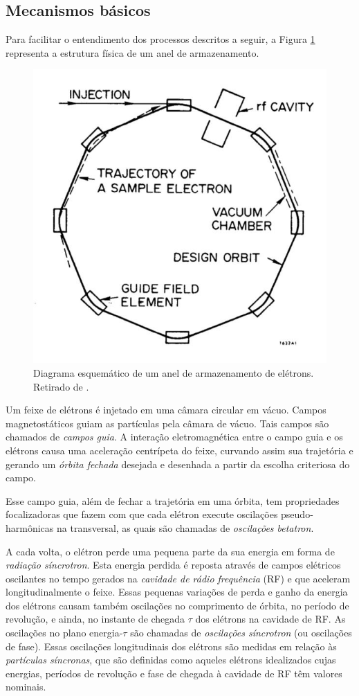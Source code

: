 \subsection{Mecanismos básicos}
Para facilitar o entendimento dos processos descritos a seguir, a Figura \ref{fig:ring} representa a estrutura física de um anel de armazenamento.
	
\begin{figure}[!htb]
	\centering
	\includegraphics[width=0.6\linewidth]{./Figuras/fig1.jpeg}
	\caption{Diagrama esquemático de um anel de armazenamento de elétrons. Retirado de 						\cite{sands1970physics}.}
	\label{fig:ring}
\end{figure}
	
Um feixe de elétrons é injetado em uma câmara circular em vácuo. Campos magnetostáticos guiam as partículas pela câmara de vácuo. Tais campos são chamados de \emph{campos guia}. A interação eletromagnética entre o campo guia e os elétrons causa uma aceleração centrípeta do feixe, curvando assim sua trajetória e gerando um \emph{órbita fechada} desejada e desenhada a partir da escolha criteriosa do campo.
	
Esse campo guia, além de fechar a trajetória em uma órbita, tem propriedades focalizadoras que fazem com que cada elétron execute oscilações pseudo-harmônicas na transversal, as quais são chamadas de \emph{oscilações betatron}.
	
A cada volta, o elétron perde uma pequena parte da sua energia em forma de \emph{radiação síncrotron}. Esta energia perdida é reposta através de campos elétricos oscilantes no tempo gerados na \emph{cavidade de rádio frequência} (RF) e que aceleram longitudinalmente o feixe. Essas pequenas variações de perda e ganho da energia dos elétrons causam também oscilações no comprimento de órbita, no período de revolução, e ainda, no instante de chegada $\tau$ dos elétrons na cavidade de RF. As oscilações no plano energia-$\tau$ são chamadas de \emph{oscilações síncrotron} (ou oscilações de fase). Essas oscilações longitudinais dos elétrons são medidas em relação às \emph{partículas síncronas}, que são definidas como aqueles elétrons idealizados cujas energias, períodos de revolução e fase de chegada à cavidade de RF têm valores nominais.

